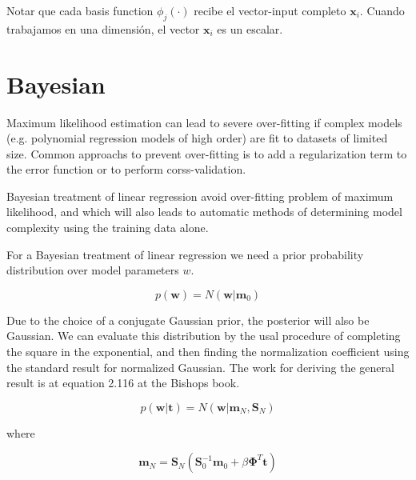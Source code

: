 \documentclass[a4paper,10pt]{article}
\begin{document}
Notar que cada basis function $\phi_j(\cdot)$ recibe el vector-input completo $\bm{x}_i$.
Cuando trabajamos en una dimensi\'on, el vector $\bm{x}_i$ es un escalar.



% 





\section{Bayesian}

Maximum likelihood estimation can lead to severe over-fitting if complex models (e.g. polynomial regression models of high order) are fit to datasets of limited size.
Common approachs to prevent over-fitting is to add a regularization term to the error function or to perform corss-validation.

\begin{framed}
Bayesian treatment of linear regression avoid over-fitting problem of maximum likelihood, and which will also leads to automatic methods of determining model complexity using the training data alone.
\end{framed}

For a Bayesian treatment of linear regression we need a prior probability distribution over model parameters $w$.

\begin{equation}
 p(\bm{w}) = N(\bm{w}|\bm{m}_0)
\end{equation}

Due to the choice of a conjugate Gaussian prior, the posterior will also be Gaussian.
We can evaluate this distribution by the usal procedure of completing the square in the exponential, and then finding the normalization coefficient using the standard result for normalized Gaussian.
The work for deriving the general result is at equation 2.116 at the Bishops book.

\begin{equation}
 p(\bm{w}|\bm{t}) = N(\bm{w}|\bm{m}_N, \bm{S}_N)
\end{equation}

where 

\begin{equation}
 \bm{m}_N = \bm{S}_N (\bm{S}_0^{-1} \bm{m}_0 + \beta \bm{\Phi}^T \bm{t})
\end{equation}
\end{document}
